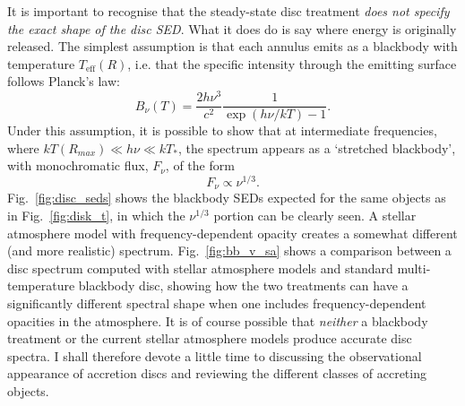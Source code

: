 It is important to recognise that the steady-state disc treatment
{\sl does not specify the exact shape of the disc SED}. What it does do is 
say where energy is originally released. The simplest assumption is
that each annulus emits as a blackbody with temperature 
$T_{\mathrm{eff}} (R)$, i.e. that the specific intensity through the emitting surface
follows Planck's law:
\begin{equation}
B_\nu (T) = \frac{2 h \nu^3}{c^2} \frac{1}{\exp(h\nu / kT) - 1}.
\label{eq:planck}
\end{equation}
Under this assumption, it is possible to show that at intermediate frequencies, 
where $kT(R_{max}) \ll h \nu \ll kT_*$,
the spectrum appears as a `stretched blackbody', with monochromatic flux, 
$F_\nu$, of the form 
\begin{equation}
F_{\nu} \propto \nu^{1/3}.
\end{equation}
Fig.~\ref{fig:disc_seds} shows the blackbody SEDs expected for the same 
objects as in Fig.~\ref{fig:disk_t}, in
which the $\nu^{1/3}$ portion can be clearly seen.
A stellar atmosphere model with frequency-dependent opacity creates a somewhat 
different (and more realistic) spectrum. 
Fig.~\ref{fig:bb_v_sa} shows a comparison between a disc spectrum computed with 
stellar atmosphere models and standard multi-temperature blackbody disc, showing how the two treatments
can have a significantly different spectral shape when one includes frequency-dependent opacities
in the atmosphere. It is of course possible that {\em neither} a blackbody treatment
or the current stellar atmosphere models produce accurate disc spectra. 
I shall therefore devote a little time to discussing
the observational appearance of accretion discs and reviewing
the different classes of accreting objects.

